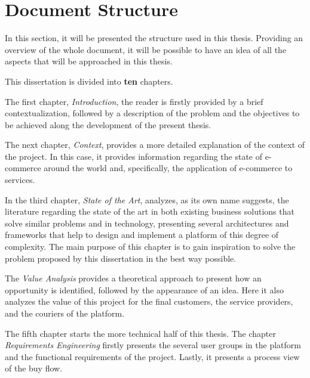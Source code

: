\section{Document Structure}
\label{sec:chap1_document_organization}
In this section, it will be presented the structure used in this thesis. Providing an overview of the whole document, it will be possible to have an idea of all the aspects that will be approached in this thesis. 
\par
This dissertation is divided into \textbf{ten} chapters.
\par
The first chapter, \textit{Introduction}, the reader is firstly provided by a brief contextualization, followed by a description of the problem and the objectives to be achieved along the development of the present thesis.
\par
The next chapter, \textit{Context}, provides a more detailed explanation of the context of the project. In this case, it provides information regarding the state of e-commerce around the world and, specifically, the application of e-commerce to services.
\par
In the third chapter, \textit{State of the Art}, analyzes, as its own name suggests, the literature regarding the state of the art in both existing business solutions that solve similar problems and in technology, presenting several architectures and frameworks that help to design and implement a platform of this degree of complexity. The main purpose of this chapter is to gain inspiration to solve the problem proposed by this dissertation in the best way possible.
\par
The \textit{Value Analysis} provides a theoretical approach to present how an opportunity is identified, followed by the appearance of an idea. Here it also analyzes the value of this project for the final customers, the service providers, and the couriers of the platform.
\par
The fifth chapter starts the more technical half of this thesis. The chapter \textit{Requirements Engineering} firstly presents the several user groups in the platform and the functional requirements of the project. Lastly, it presents a process view of the buy flow.
\par

